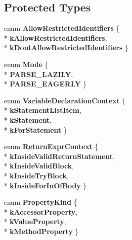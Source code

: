 \subsection*{Protected Types}
\begin{DoxyCompactItemize}
\item 
enum {\bfseries Allow\+Restricted\+Identifiers} \{ \\*
{\bfseries k\+Allow\+Restricted\+Identifiers}, 
\\*
{\bfseries k\+Dont\+Allow\+Restricted\+Identifiers}
 \}\hypertarget{classv8_1_1internal_1_1_parser_base_abaaa5f38ca6d6f9809f6f1d236cee954}{}\label{classv8_1_1internal_1_1_parser_base_abaaa5f38ca6d6f9809f6f1d236cee954}

\item 
enum {\bfseries Mode} \{ \\*
{\bfseries P\+A\+R\+S\+E\+\_\+\+L\+A\+Z\+I\+LY}, 
\\*
{\bfseries P\+A\+R\+S\+E\+\_\+\+E\+A\+G\+E\+R\+LY}
 \}\hypertarget{classv8_1_1internal_1_1_parser_base_ab90834d36492d39261738be7849e2d47}{}\label{classv8_1_1internal_1_1_parser_base_ab90834d36492d39261738be7849e2d47}

\item 
enum {\bfseries Variable\+Declaration\+Context} \{ \\*
{\bfseries k\+Statement\+List\+Item}, 
\\*
{\bfseries k\+Statement}, 
\\*
{\bfseries k\+For\+Statement}
 \}\hypertarget{classv8_1_1internal_1_1_parser_base_a82baab97427f3ea183909b7877f54712}{}\label{classv8_1_1internal_1_1_parser_base_a82baab97427f3ea183909b7877f54712}

\item 
enum {\bfseries Return\+Expr\+Context} \{ \\*
{\bfseries k\+Inside\+Valid\+Return\+Statement}, 
\\*
{\bfseries k\+Inside\+Valid\+Block}, 
\\*
{\bfseries k\+Inside\+Try\+Block}, 
\\*
{\bfseries k\+Inside\+For\+In\+Of\+Body}
 \}\hypertarget{classv8_1_1internal_1_1_parser_base_ae4d5a58c2014ade3c620c422616e92c1}{}\label{classv8_1_1internal_1_1_parser_base_ae4d5a58c2014ade3c620c422616e92c1}

\item 
enum {\bfseries Property\+Kind} \{ \\*
{\bfseries k\+Accessor\+Property}, 
\\*
{\bfseries k\+Value\+Property}, 
\\*
{\bfseries k\+Method\+Property}
 \}\hypertarget{classv8_1_1internal_1_1_parser_base_ac80708c3ae7276debfea0504986c257f}{}\label{classv8_1_1internal_1_1_parser_base_ac80708c3ae7276debfea0504986c257f}

\end{DoxyCompactItemize}
